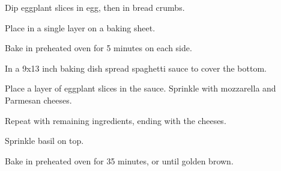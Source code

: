 \vspace{.5in}

\begin{method}
    Dip eggplant slices in egg, then in bread crumbs. 
    
    Place in a single layer on a baking sheet. 
    
    Bake in preheated oven for 5 minutes on each side.
    
    In a 9x13 inch baking dish spread spaghetti sauce 
    to cover the bottom. 
    
    Place a layer of eggplant slices in the sauce. Sprinkle 
    with mozzarella and Parmesan cheeses. 
    
    Repeat with remaining ingredients, ending with the cheeses. 
    
    Sprinkle basil on top.
    
    Bake in preheated oven for 35 minutes, or until 
    golden brown.
\end{method}

\newpage